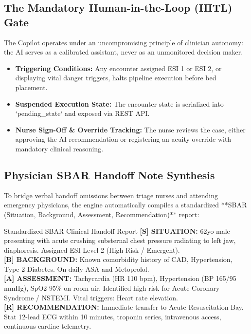 \documentclass[11pt,a4paper]{article}
\begin{document}
\subsection{The Mandatory Human-in-the-Loop (HITL) Gate}
The Copilot operates under an uncompromising principle of clinician autonomy: the AI serves as a calibrated assistant, never as an unmonitored decision maker.
\begin{itemize}[leftmargin=1.5em]
    \item \textbf{Triggering Conditions:} Any encounter assigned ESI 1 or ESI 2, or displaying vital danger triggers, halts pipeline execution before bed placement.
    \item \textbf{Suspended Execution State:} The encounter state is serialized into `pending_state` and exposed via REST API.
    \item \textbf{Nurse Sign-Off \& Override Tracking:} The nurse reviews the case, either approving the AI recommendation or registering an acuity override with mandatory clinical reasoning.
\end{itemize}

\subsection{Physician SBAR Handoff Note Synthesis}
To bridge verbal handoff omissions between triage nurses and attending emergency physicians, the engine automatically compiles a standardized **SBAR (Situation, Background, Assessment, Recommendation)** report:

\begin{clinicalbox}{Standardized SBAR Clinical Handoff Report}
\textbf{[S] SITUATION:} 62yo male presenting with acute crushing substernal chest pressure radiating to left jaw, diaphoresis. Assigned ESI Level 2 (High Risk / Emergent).\\
\textbf{[B] BACKGROUND:} Known comorbidity history of CAD, Hypertension, Type 2 Diabetes. On daily ASA and Metoprolol.\\
\textbf{[A] ASSESSMENT:} Tachycardia (HR 110 bpm), Hypertension (BP 165/95 mmHg), SpO2 95\% on room air. Identified high risk for Acute Coronary Syndrome / NSTEMI. Vital triggers: Heart rate elevation.\\
\textbf{[R] RECOMMENDATION:} Immediate transfer to Acute Resuscitation Bay. Stat 12-lead ECG within 10 minutes, troponin series, intravenous access, continuous cardiac telemetry.
\end{clinicalbox}
\end{document}
